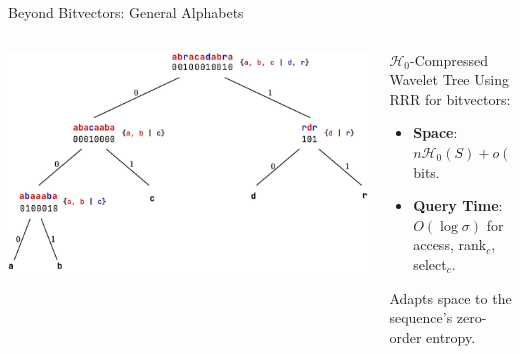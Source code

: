 \begin{frame}{Beyond Bitvectors: General Alphabets}
{\begin{columns}[T]
\begin{column}{0.55\textwidth}
                \includegraphics[width=\textwidth]{assets/wt4.pdf}
            \end{column}
            \begin{column}{0.45\textwidth} %
                \begin{block}{$\mathcal{H}_0$-Compressed Wavelet Tree} %
                    Using RRR for bitvectors:
                    \begin{itemize}
                        \item \textbf{Space}: $n \mathcal{H}_0(S) + o(n \log \sigma)$ bits.
                        \item \textbf{Query Time}: $O(\log \sigma)$ for \textsf{access}, \textsf{rank}$_c$, \textsf{select}$_c$.
                    \end{itemize}
                    Adapts space to the sequence's zero-order entropy.
                \end{block}
            \end{column}
        \end{columns}
    }
\end{frame}

